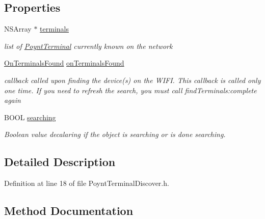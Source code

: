 \subsection*{Properties}
\begin{DoxyCompactItemize}
\item 
N\+S\+Array $\ast$ \hyperlink{interface_poynt_terminal_discover_a5388c2786127d007a5b553986779ee46}{terminals}
\begin{DoxyCompactList}\small\item\em list of \hyperlink{interface_poynt_terminal}{Poynt\+Terminal} currently known on the network \end{DoxyCompactList}\item 
\hyperlink{_poynt_terminal_discover_8h_a45c48a836064cd340f281fa5ef2edef5}{On\+Terminals\+Found} \hyperlink{interface_poynt_terminal_discover_a2108a121006de9953dbf24fa265db472}{on\+Terminals\+Found}
\begin{DoxyCompactList}\small\item\em callback called upon finding the device(s) on the W\+I\+FI.  This callback is called only one time. If you need to refresh the search, you must call find\+Terminals\+:complete again \end{DoxyCompactList}\item 
B\+O\+OL \hyperlink{interface_poynt_terminal_discover_a3ec4dc196847dee68ad6c99d08bfef95}{searching}
\begin{DoxyCompactList}\small\item\em Boolean value decalaring if the object is searching or is done searching. \end{DoxyCompactList}\end{DoxyCompactItemize}


\subsection{Detailed Description}


Definition at line 18 of file Poynt\+Terminal\+Discover.\+h.



\subsection{Method Documentation}
\hypertarget{interface_poynt_terminal_discover_aab8fdef29321b4bf9ff4ba57e1593e9a}{}\label{interface_poynt_terminal_discover_aab8fdef29321b4bf9ff4ba57e1593e9a} 
